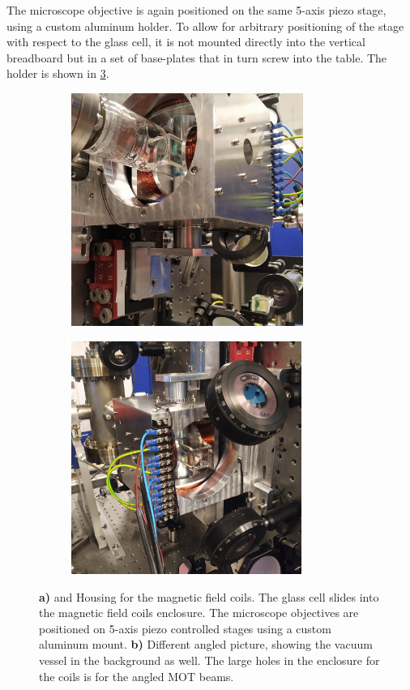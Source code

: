 The microscope objective is again positioned on the same 5-axis piezo stage, using a custom aluminum holder.
To allow for arbitrary positioning of the stage with respect to the glass cell, it is not mounted directly into the vertical breadboard but in a set of base-plates that in turn screw into the table.
The holder is shown in \cref{fig:Coils}.
\begin{figure}
	\begin{subfigure}{.49\linewidth}
		\flushleft
		\includegraphics[height=7.6cm]{figures/CoilsCropped.jpg}
		\caption{}
		\label{fig:Coils1}
	\end{subfigure}
	\hfill
	\begin{subfigure}{.49\linewidth}
		\flushright
		\includegraphics[height=7.6cm]{figures/CoilsCropped2.jpg}
		\caption{}
		\label{fig:Coils2}
	\end{subfigure}
	\caption{
	\textsf{\textbf{a)}} and  Housing for the magnetic field coils. 
	The glass cell slides into the magnetic field coils enclosure.
    The microscope objectives are positioned on 5-axis piezo controlled stages using a custom aluminum mount. 
    \textsf{\textbf{b)}} Different angled picture, showing the vacuum vessel in the background as well. 
    The large holes in the enclosure for the coils is for the angled MOT beams.
    }
    \label{fig:Coils}
\end{figure}
